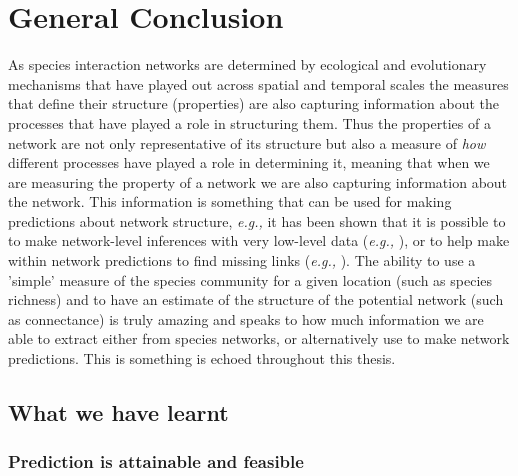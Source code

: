\anglais
\doublespacing
\chapter{General Conclusion}\label{Conclusion}
\begin{refsection}

As species interaction networks are determined by ecological and evolutionary mechanisms that have played out across spatial and temporal scales the measures that define their structure (properties) are also capturing information about the processes that have played a role in structuring them. Thus the properties of a network are not only representative of its structure but also a measure of \emph{how} different processes have played a role in determining it, meaning that when we are measuring the property of a network we are also capturing information about the network. This information is something that can be used for making predictions about network structure, \emph{e.g.,} it has been shown that it is possible to to make network-level inferences with very low-level data (\emph{e.g.,} \cite{MacDonald2020Revisiting, Banville2023What}), or to help make within network predictions to find missing links (\emph{e.g.,} \cite{Poisot2023Network, Stock2021Pairwise}). The ability to use a 'simple' measure of the species community for a given location (such as species richness) and to have an estimate of the structure of the potential network (such as connectance) is truly amazing and speaks to how much information we are able to extract either from species networks, or alternatively use to make network predictions. This is something is echoed throughout this thesis.

\section{What we have learnt}

\subsection{Prediction is attainable and feasible}


\end{refsection}
